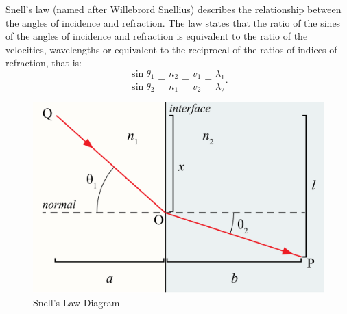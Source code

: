 Snell's law (named after Willebrord Snellius) describes the relationship between the angles of incidence and refraction. The law states that the ratio of the sines of the angles of incidence and refraction is equivalent to the ratio of the velocities, wavelengths or equivalent to the reciprocal of the ratios of indices of refraction, that is:
\begin{equation}
    \frac{\sin \theta_1}{\sin \theta_2} = \frac{n_2}{n_1} = \frac{v_1}{v_2} = \frac{\lambda_1}{\lambda_2}. 
\end{equation}

\begin{figure}[h!]
    \centering
    \includegraphics[scale=0.1]{notes/images/Snells-Law.JPG}
    \caption{Snell's Law Diagram}
\end{figure}
\FloatBarrier

